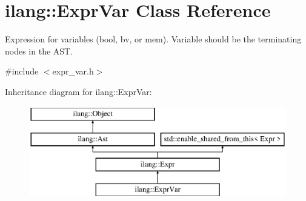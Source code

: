 \hypertarget{classilang_1_1_expr_var}{}\section{ilang\+:\+:Expr\+Var Class Reference}
\label{classilang_1_1_expr_var}


Expression for variables (bool, bv, or mem). Variable should be the terminating nodes in the A\+ST.  




{\ttfamily \#include $<$expr\+\_\+var.\+h$>$}

Inheritance diagram for ilang\+:\+:Expr\+Var\+:\begin{figure}[H]
\begin{center}
\leavevmode
\includegraphics[height=4.000000cm]{classilang_1_1_expr_var}
\end{center}
\end{figure}
